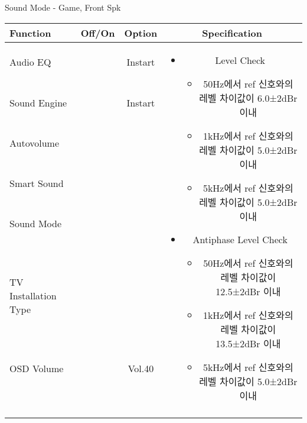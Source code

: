 \begin{frame}[t]{Sound Mode - Game, Front Spk}
\begin{tiny}
\begin{tabular}{@{}lccc@{}}
\toprule
Function & Off/On & Option & Specification \\
\midrule
Audio EQ & \color{black}{Off} & Instart &
\multirow{10}{60mm}{
\begin{itemize}
\item Level Check
  \begin{itemize}
  \item 50Hz에서 ref 신호와의 레벨 차이값이 6.0±2dBr 이내
  \item 1kHz에서 ref 신호와의 레벨 차이값이 5.0±2dBr 이내
  \item 5kHz에서 ref 신호와의 레벨 차이값이 5.0±2dBr 이내
  \end{itemize}
\item Antiphase Level Check
  \begin{itemize}
  \item 50Hz에서 ref 신호와의 레벨 차이값이 12.5±2dBr 이내
  \item 1kHz에서 ref 신호와의 레벨 차이값이 13.5±2dBr 이내
  \item 5kHz에서 ref 신호와의 레벨 차이값이 5.0±2dBr 이내
  \end{itemize}
\end{itemize}
} \\
Sound Engine & \color{blue}{On} & Instart & \\
Autovolume & \color{black}{Off} & & \\
Smart Sound & \color{black}{Off} & & \\
Sound Mode & \color{blue}{On} & \color{blue}{Game} & \\
TV Installation Type & \color{blue}{On} & \color{black}{Standtype1} & \\
OSD Volume & \color{blue}{On} & Vol.40 & \\
& & & \\
& & & \\
& & & \\
& & & \\
\midrule
\end{tabular}
\end{tiny}

\end{frame}



